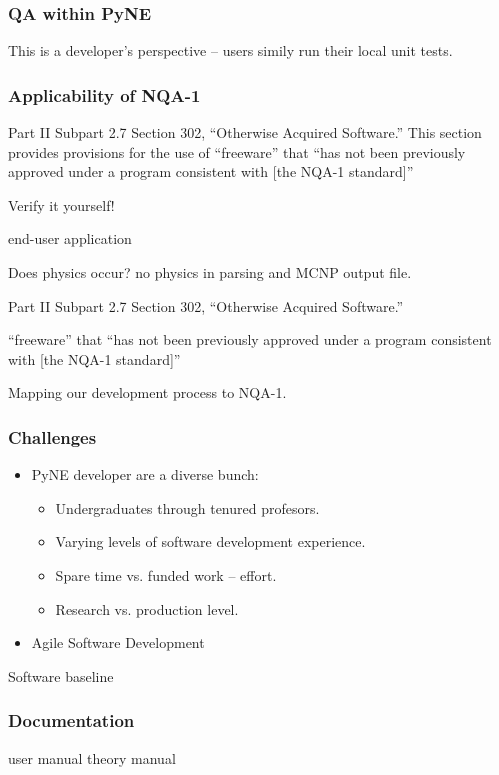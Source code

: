 \documentclass[12pt]{beamer}
\begin{document}
\begin{frame}
\frametitle{QA within PyNE}
This is a developer's perspective -- users simily run their local unit tests.
\end{frame}


\begin{frame}
\frametitle{Applicability of NQA-1}


Part II
Subpart 2.7 Section 302, “Otherwise Acquired Software.”
This section provides provisions for the use of “freeware”
that “has not been previously approved under a program
consistent with [the NQA-1 standard]”

Verify it yourself!

end-user application

Does physics occur? no physics in parsing and MCNP output file.


Part II Subpart 2.7 Section 302, “Otherwise Acquired Software.”

“freeware” that “has not been previously
approved under a program consistent with [the NQA-1 standard]”

Mapping our development process to NQA-1.

\end{frame}


\begin{frame}[fragile]
\frametitle{Challenges}

\begin{itemize}
\item{PyNE developer are a diverse bunch}:
   \begin{itemize}
   \item{Undergraduates through tenured profesors.}
   \item{Varying levels of software development experience.}
   \item{Spare time vs. funded work -- effort.}
   \item{Research vs. production level.}
   \end{itemize}
\item{Agile Software Development \cite{larman2004agile}}
\end{itemize}

Software baseline
\end{frame}

\begin{frame}
\frametitle{Documentation}
user manual
theory manual
\end{frame}
\end{document}
